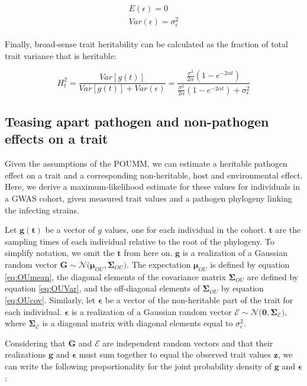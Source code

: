 \documentclass[11pt]{article}
\begin{document}
\begin{linenumbers}
\begin{align}
\begin{split}
	E(\epsilon) = 0 \\
	Var(\epsilon) = \sigma^2_\epsilon
\end{split}
\end{align}

Finally, broad-sense trait heritability can be calculated as the fraction of total trait variance that is heritable:

\begin{equation}
	H^2_{t} = \frac{Var[g(t)]}{Var[g(t)] + Var(\epsilon)} = \frac{\frac{\sigma^2}{2\alpha}(1 - e^{-2\alpha t})}{\frac{\sigma^2}{2\alpha}(1 - e^{-2\alpha t}) + \sigma^2_\epsilon}
	\label{eq:POUMM-H2}
\end{equation}

\subsection*{Teasing apart pathogen and non-pathogen effects on a trait}

Given the assumptions of the POUMM, we can estimate a heritable pathogen effect on a trait and a corresponding non-heritable, host and environmental effect. Here, we derive a maximum-likelihood estimate for these values for individuals in a GWAS cohort, given measured trait values and a pathogen phylogeny linking the infecting strains.

Let $\bm{g}(\bm{t})$ be a vector of $g$ values, one for each individual in the cohort. $\bm{t}$ are the sampling times of each individual relative to the root of the phylogeny. To simplify notation, we omit the $\bm{t}$ from here on. $\bm{g}$ is a realization of a Gaussian random vector $\bm{G} \sim \mathcal{N}\big(\bm{\mu}_{OU}, \boldsymbol{\Sigma}_{OU}\big)$. The expectation $\bm{\mu}_{OU}$ is defined by equation \ref{eq:OUmean}, the diagonal elements of the covariance matrix $\boldsymbol{\Sigma}_{OU}$ are defined by equation \ref{eq:OUVar}, and the off-diagonal elements of $\boldsymbol{\Sigma}_{OU}$ by equation \ref{eq:OUcov}. Similarly, let $\bm{\epsilon}$ be a vector of the non-heritable part of the trait for each individual.  $\bm{\epsilon}$ is a realization of a Gaussian random vector $\bm{\mathcal{E}} \sim \mathcal{N}\big(\bm{0}, \boldsymbol{\Sigma}_\mathcal{E}\big)$, where $\boldsymbol{\Sigma}_\mathcal{E}$ is a diagonal matrix with diagonal elements equal to $\sigma^2_\epsilon$.

Considering that $\bm{G}$ and $\bm{\mathcal{E}}$ are independent random vectors and that their realizations $\bm{g}$ and $\bm{\epsilon}$ must sum together to equal the observed trait values $\bm{z}$, we can write the following proportionality for the joint probability density of $\bm{g}$ and $\bm{\epsilon}$:


\end{linenumbers}
\end{document}
